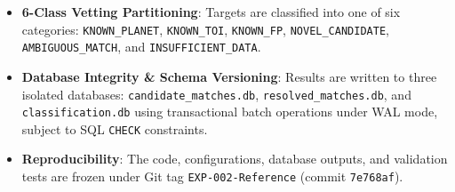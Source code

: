 \begin{itemize}
\begin{enumerate}
            \item \textbf{Rule TB-03 (Alphanumeric sorting)}: If both spatial and temporal differences are identical, select the candidate sorting first alphanumerically by catalog identifier.
        \end{enumerate}
    \item \textbf{6-Class Vetting Partitioning}: Targets are classified into one of six categories: \texttt{KNOWN\_PLANET}, \texttt{KNOWN\_TOI}, \texttt{KNOWN\_FP}, \texttt{NOVEL\_CANDIDATE}, \texttt{AMBIGUOUS\_MATCH}, and \texttt{INSUFFICIENT\_DATA}.
    \item \textbf{Database Integrity \& Schema Versioning}: Results are written to three isolated databases: \texttt{candidate\_matches.db}, \texttt{resolved\_matches.db}, and \texttt{classification.db} using transactional batch operations under WAL mode, subject to SQL \texttt{CHECK} constraints.
    \item \textbf{Reproducibility}: The code, configurations, database outputs, and validation tests are frozen under Git tag \texttt{EXP-002-Reference} (commit \texttt{7e768af}).
\end{itemize}

